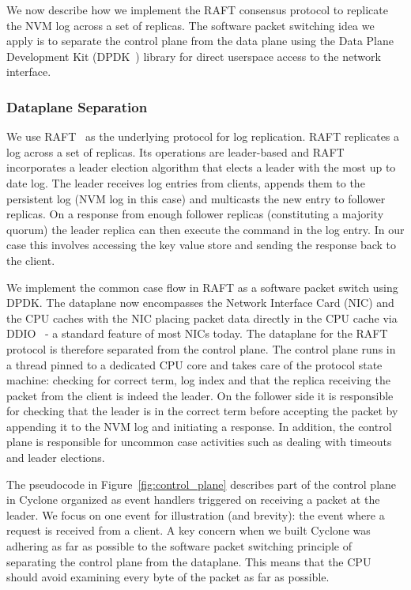 \documentclass[pageno]{jpaper}
\begin{document}
We now describe how we implement the RAFT consensus protocol to replicate the
NVM log across a set of replicas. The software packet switching idea we apply is
to separate the control plane from the data plane using the Data Plane
Development Kit (DPDK~\cite{dpdk}) library for direct userspace access to the
network interface.

\subsubsection{Dataplane Separation}
We use RAFT~\cite{raft} as the underlying protocol for log replication. RAFT
replicates a log across a set of replicas. Its operations are leader-based and
RAFT incorporates a leader election algorithm that elects a leader with the most
up to date log. The leader receives log entries from clients, appends them to the
persistent log (NVM log in this case) and multicasts the new entry to follower
replicas. On a response from enough follower replicas (constituting a majority
quorum) the leader replica can then execute the command in the log entry. In
our case this involves accessing the key value store and sending the response
back to the client.

We implement the common case flow in RAFT as a software packet switch using
DPDK. The dataplane now encompasses the Network Interface Card (NIC) and the CPU
caches with the NIC placing packet data directly in the CPU cache via
DDIO~\cite{ddio} - a standard feature of most NICs today. The dataplane for the
RAFT protocol is therefore separated from the control plane. The control plane
runs in a thread pinned to a dedicated CPU core and takes care of the protocol
state machine: checking for correct term, log index and that the replica
receiving the packet from the client is indeed the leader. On the follower side
it is responsible for checking that the leader is in the correct term before
accepting the packet by appending it to the NVM log and initiating a
response. In addition, the control plane is responsible for uncommon case
activities such as dealing with timeouts and leader elections.

The pseudocode in Figure~\ref{fig:control_plane} describes part of the control
plane in Cyclone organized as event handlers triggered on receiving a packet at
the leader. We focus on one event for illustration (and brevity): the event
where a request is received from a client. A key concern when we built Cyclone
was adhering as far as possible to the software packet switching principle of
separating the control plane from the dataplane. This means that the CPU should
avoid examining every byte of the packet as far as possible.
\end{document}
